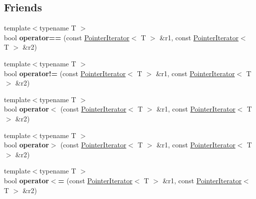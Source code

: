 \subsection*{Friends}
\begin{DoxyCompactItemize}
\item 
\hypertarget{classkeycpp_1_1_pointer_iterator_a06dfe074dcfe7a2ab9527586369dbcc3}{{\footnotesize template$<$typename T $>$ }\\bool {\bfseries operator==} (const \hyperlink{classkeycpp_1_1_pointer_iterator}{Pointer\-Iterator}$<$ T $>$ \&r1, const \hyperlink{classkeycpp_1_1_pointer_iterator}{Pointer\-Iterator}$<$ T $>$ \&r2)}\label{classkeycpp_1_1_pointer_iterator_a06dfe074dcfe7a2ab9527586369dbcc3}

\item 
\hypertarget{classkeycpp_1_1_pointer_iterator_a7682ba01e82b3aba962c6ee0c32d4d3d}{{\footnotesize template$<$typename T $>$ }\\bool {\bfseries operator!=} (const \hyperlink{classkeycpp_1_1_pointer_iterator}{Pointer\-Iterator}$<$ T $>$ \&r1, const \hyperlink{classkeycpp_1_1_pointer_iterator}{Pointer\-Iterator}$<$ T $>$ \&r2)}\label{classkeycpp_1_1_pointer_iterator_a7682ba01e82b3aba962c6ee0c32d4d3d}

\item 
\hypertarget{classkeycpp_1_1_pointer_iterator_af558be7c8449cd575bbf7b362d27b6f9}{{\footnotesize template$<$typename T $>$ }\\bool {\bfseries operator$<$} (const \hyperlink{classkeycpp_1_1_pointer_iterator}{Pointer\-Iterator}$<$ T $>$ \&r1, const \hyperlink{classkeycpp_1_1_pointer_iterator}{Pointer\-Iterator}$<$ T $>$ \&r2)}\label{classkeycpp_1_1_pointer_iterator_af558be7c8449cd575bbf7b362d27b6f9}

\item 
\hypertarget{classkeycpp_1_1_pointer_iterator_a29c4edb27dcc46bea93df78eef3eb1f7}{{\footnotesize template$<$typename T $>$ }\\bool {\bfseries operator$>$} (const \hyperlink{classkeycpp_1_1_pointer_iterator}{Pointer\-Iterator}$<$ T $>$ \&r1, const \hyperlink{classkeycpp_1_1_pointer_iterator}{Pointer\-Iterator}$<$ T $>$ \&r2)}\label{classkeycpp_1_1_pointer_iterator_a29c4edb27dcc46bea93df78eef3eb1f7}

\item 
\hypertarget{classkeycpp_1_1_pointer_iterator_afc6f64c3c35e55197f846b2328cb21f8}{{\footnotesize template$<$typename T $>$ }\\bool {\bfseries operator$<$=} (const \hyperlink{classkeycpp_1_1_pointer_iterator}{Pointer\-Iterator}$<$ T $>$ \&r1, const \hyperlink{classkeycpp_1_1_pointer_iterator}{Pointer\-Iterator}$<$ T $>$ \&r2)}\label{classkeycpp_1_1_pointer_iterator_afc6f64c3c35e55197f846b2328cb21f8}


\end{DoxyCompactItemize}
